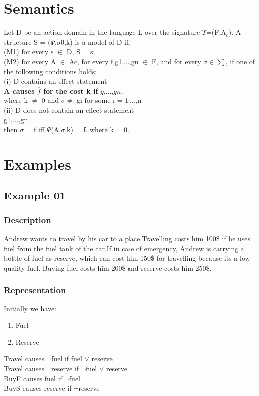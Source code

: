 \documentclass[11pt]{article}
\begin{document}
\section{Semantics}\label{sec:semantics}
Let D be an action domain in the language L over the signature $\Upsilon$=(F,A$_{c}$). A structure S = ($\Psi$,$\sigma$0,k) is a model of D iff\\
(M1) for every s $\in$ D, S \textbar= s;\\
(M2) for every A $\in$ Ac, for every f,g1,...,gn $\in$ F, and for every $\sigma\in\sum$, if one of the following conditions holds:
\\\indent
(i) D contains an effect statement\\
\indent\indent 
{\bfseries A causes $\overline{f}$ for the cost k if} $\overline{g}$,...,$\overline{gn}$,\\
\indent where k $\neq$ 0 and $\sigma$\textbar$\neq$  gi for some i = 1,...,n\\
\indent(ii) D does not contain an effect statement\\
\indent{} g1,...,gn\\
\indent then $\sigma$ \textbar= f iff $\Psi$(A,$\sigma$,k) \textbar= f. where k = 0.\\
\pagebreak
\section{Examples}\label{sec:Examples}
\subsection{Example 01}\label{example:ex01}
\subsubsection{Description}\label{par:p101}
Andrew wants to travel by his car to a place.Travelling costs him 100\$ if he uses fuel from the fuel tank of the car.If in case of emergency, Andrew is carrying a bottle of fuel as reserve, which can cost him 150\$ for travelling because its a low quality fuel. Buying fuel costs him 200\$ and reserve costs him 250\$.\\
\subsubsection{Representation}\label{par:p201}
Initially we have:
\begin{enumerate}
\item Fuel
\item Reserve
\end{enumerate}
Travel causes $\neg$fuel if fuel $\vee$ reserve\\
Travel causes $\neg$reserve if $\neg$fuel $\vee$ reserve\\
BuyF causes fuel if $\neg$fuel\\ 
BuyS causes reserve if $\neg$reserve\\
\end{document}
